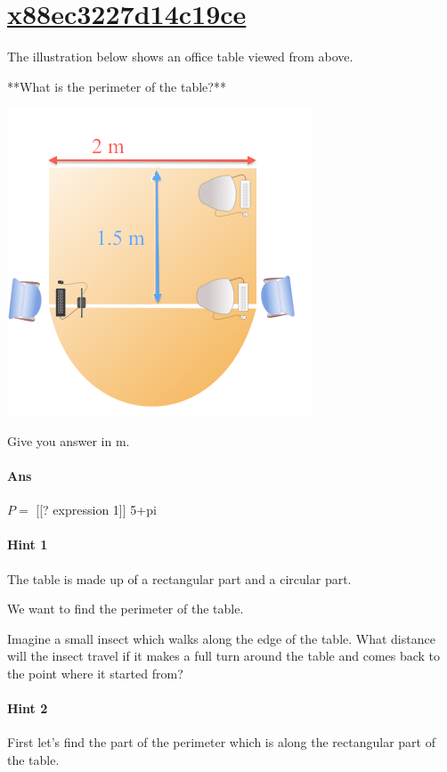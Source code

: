 \documentclass[twocolumn,10pt]{article}
\def\shrinkfactor{0.45}
\begin{document}
\section{\href{https://www.khanacademy.org/devadmin/content/items/x88ec3227d14c19ce}{x88ec3227d14c19ce}}

\noindent
The illustration below shows an office table viewed from above.  

**What is the perimeter of the table?**   

\includegraphics[scale=\shrinkfactor]{figures/2e7c87313a5fdbe0bacdee8a3f8f46418add2f40.png}

Give you answer in $\text{m}$.

\paragraph{Ans} $P=$ 
[[? expression 1]]     5+pi

\paragraph{Hint 1}The table is made up of a rectangular part and a circular part.

We want to find the perimeter of the table. 

Imagine a small insect which walks along the edge of the table. What distance will the insect travel if it makes a full turn around the table and comes back to the point where it started from? 

\paragraph{Hint 2}First let's find the part of the perimeter which is along the rectangular part of the table.
\end{document}
